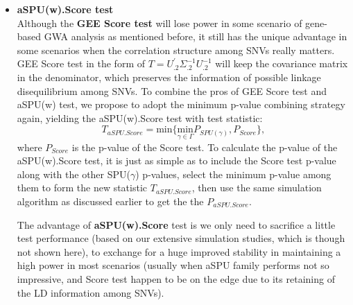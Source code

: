 \documentclass[12pt]{article}
\begin{document}
\begin{itemize}
\item \textbf{aSPU(w).Score test }\\
Although the \textbf{GEE Score test} will lose power in some scenario of gene-based GWA analysis as mentioned before, it still has the unique advantage in some scenarios when the correlation structure among SNVs really matters. GEE Score test in the form of $T=U_{.2}^{'}\Sigma_{.2}^{-1}U_{.2}^{-1}$ will keep the covariance matrix in the denominator, which preserves the information of possible linkage disequilibrium among SNVs. To combine the pros of GEE Score test and aSPU(w) test, we propose to adopt the minimum p-value combining strategy again, yielding the aSPU(w).Score test with test statistic:
$$
T_{aSPU.Score} = \textrm{min} \Big\{ \underset{\gamma\in\Gamma}{ \textrm{min} } P_{ SPU(\gamma) }, P_{Score} \Big\},
$$ 
where $P_{Score}$ is the p-value of the Score test. To calculate the p-value of the aSPU(w).Score test, it is just as simple as to include the Score test p-value along with the other SPU($\gamma$) p-values, select the minimum p-value among them to form the new statistic $T_{aSPU.Score}$, then use the same simulation algorithm as discussed earlier to get the the $P_{aSPU.Score}$.

The advantage of \textbf{aSPU(w).Score} test is we only need to sacrifice a little test performance (based on our extensive simulation studies, which is though not shown here), to exchange for a huge improved stability in maintaining a high power in most scenarios (usually when aSPU family performs not so impressive, and Score test happen to be on the edge due to its retaining of the LD information among SNVs).
\end{itemize}


\end{document}
